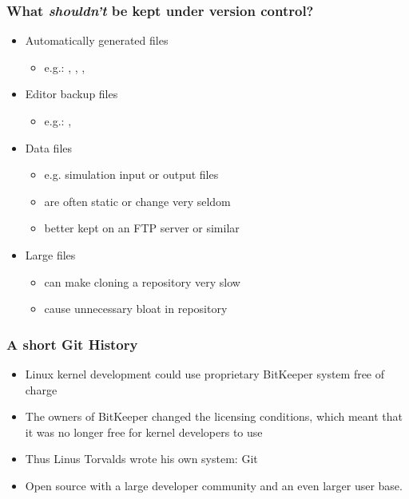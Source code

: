 \begin{frame}
\frametitle{What \emph{shouldn't} be kept under version control?}
\begin{itemize}
    \item Automatically generated files
        \begin{itemize}
            \item e.g.: , , , 
        \end{itemize}
    \item Editor backup files
        \begin{itemize}
            \item e.g.: , 
        \end{itemize}
    \item Data files
        \begin{itemize}
            \item e.g. simulation input or output files
            \item are often static or change very seldom
            \item better kept on an FTP server or similar
        \end{itemize}
    \item Large files
        \begin{itemize}
            \item can make cloning a repository very slow
            \item cause unnecessary bloat in repository
        \end{itemize}
\end{itemize}
\end{frame}

\begin{frame}
\frametitle{A short Git History}
\begin{itemize}
    \item Linux kernel development could use proprietary BitKeeper system
        free of charge
    \item The owners of BitKeeper changed the licensing conditions, which
        meant that it was no longer free for kernel developers to use
    \item Thus Linus Torvalds wrote his own system: Git
    \item Open source with a large developer community and an even larger
        user base.
\end{itemize}
\end{frame}

